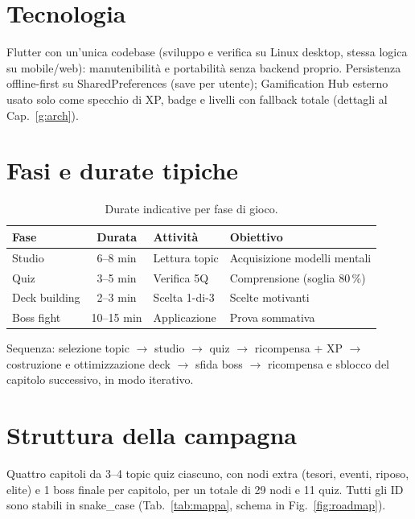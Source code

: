\section{Tecnologia}
Flutter con un'unica codebase (sviluppo e verifica su Linux desktop,
stessa logica su mobile/web): manutenibilit\`a e portabilit\`a senza
backend proprio. Persistenza offline-first su SharedPreferences (save
per utente); Gamification Hub esterno usato solo come specchio di XP,
badge e livelli con fallback totale (dettagli al Cap.~\ref{g:arch}).

\section{Fasi e durate tipiche}
\begin{table}[ht]
\centering
\footnotesize
\begin{tabularx}{\linewidth}{@{}lclX@{}}
\toprule
Fase & Durata & Attivit\`a & Obiettivo \\
\midrule
Studio & 6--8 min & Lettura topic & Acquisizione modelli mentali \\
Quiz & 3--5 min & Verifica 5Q & Comprensione (soglia 80\,\%) \\
Deck building & 2--3 min & Scelta 1-di-3 & Scelte motivanti \\
Boss fight & 10--15 min & Applicazione & Prova sommativa \\
\bottomrule
\end{tabularx}
\caption{Durate indicative per fase di gioco.}
\label{tab:fasi}
\end{table}
\noindent Sequenza: selezione topic $\rightarrow$ studio $\rightarrow$
quiz $\rightarrow$ ricompensa + XP $\rightarrow$ costruzione e
ottimizzazione deck $\rightarrow$ sfida boss $\rightarrow$
ricompensa e sblocco del capitolo successivo, in modo iterativo.

\section{Struttura della campagna}
Quattro capitoli da 3--4 topic quiz ciascuno, con nodi extra
(tesori, eventi, riposo, elite) e 1 boss finale per capitolo, per un
totale di 29 nodi e 11 quiz. Tutti gli ID sono stabili in
snake\_case (Tab.~\ref{tab:mappa}, schema in Fig.~\ref{fig:roadmap}).

